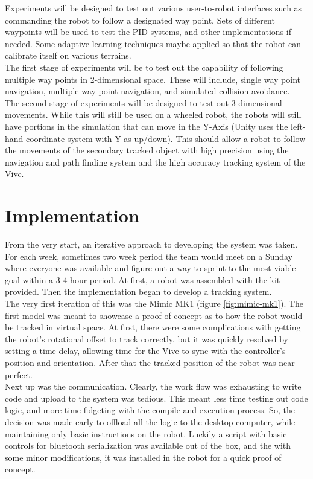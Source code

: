 \documentclass[10pt,a4paper]{article}
\begin{document}
	Experiments will be designed to test out various user-to-robot interfaces such as commanding the robot to follow a designated way point. Sets of different waypoints will be used to test the PID systems, and other implementations if needed. Some adaptive learning techniques maybe applied so that the robot can calibrate itself on various terrains.
	\\ 
	The first stage of experiments will be to test out the capability of following multiple way points in 2-dimensional space. These will include, single way point navigation, multiple way point navigation, and simulated collision avoidance.
	\\ 
	The second stage of experiments will be designed to test out 3 dimensional movements. While this will still be used on a wheeled robot, the robots will still have portions in the simulation that can move in the Y-Axis (Unity uses the left-hand coordinate system with Y as up/down). This should allow a robot to follow the movements of the secondary tracked object with high precision using the navigation and path finding system and the high accuracy tracking system of the Vive.
	
	\section*{Implementation}
	From the very start, an iterative approach to developing the system was taken. For each week, sometimes two week period the team would meet on a Sunday where everyone was available and figure out a way to sprint to the most viable goal within a 3-4 hour period. At first, a robot was assembled with the kit provided. Then the implementation began to develop a tracking system.
	\\
	The very first iteration of this was the Mimic MK1 (figure \ref{fig:mimic-mk1}). The first model was meant to showcase a proof of concept as to how the robot would be tracked in virtual space. At first, there were some complications with getting the robot's rotational offset to track correctly, but it was quickly resolved by setting a time delay, allowing time for the Vive to sync with the controller's position and orientation. After that the tracked position of the robot was near perfect.
	\\
	Next up was the communication. Clearly, the work flow was exhausting to write code and upload to the system was tedious. This meant less time testing out code logic, and more time fidgeting with the compile and execution process. So, the decision was made early to offload all the logic to the desktop computer, while maintaining only basic instructions on the robot. Luckily a script with basic controls for bluetooth serialization was available out of the box, and the with some minor modifications, it was installed in the robot for a quick proof of concept.
		
\end{document}
